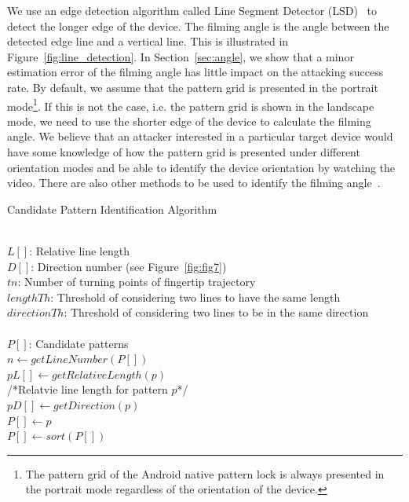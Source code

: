 We use an edge detection algorithm called Line Segment Detector (LSD)~\cite{grompone2010lsd} to detect the longer edge of the device.
The filming angle is the angle between the detected edge line and a vertical line. This is illustrated in Figure~\ref{fig:line_detection}.
In Section~\ref{sec:angle}, we show that a minor estimation error of the filming angle has little impact on the attacking success rate.
By default, we assume that the pattern grid is presented in the portrait
mode\footnote{The pattern grid of the Android native pattern lock is always presented in the portrait mode regardless of the orientation of the device.}. If this is
not the case, i.e. the pattern grid is shown in the landscape mode, we need
to use the shorter edge of the device to calculate the filming angle. We believe that an attacker interested in a particular target device would
have some knowledge of how the pattern grid is presented under different orientation modes and be able to identify the device orientation by watching the video.
There are also other methods to be used to identify the filming angle~\cite{Torralba:2002:DEI:628330.628820}.

\renewcommand{\algorithmicforall}{\textbf{for each}}
    \begin{algorithm}[!t]
        \caption{Candidate Pattern Identification Algorithm}
        \label{alg:alg1}
        \begin{algorithmic}[1]
            \REQUIRE~~\\
                $L[]$: Relative line length \\
                $D[]$: Direction number (see Figure~\ref{fig:fig7}) \\
                $tn$: Number of turning points of fingertip trajectory \\
                $lengthTh$: Threshold of considering two lines to have the same length\\
                $directionTh$: Threshold of considering two lines to be in the same direction\\
            \ENSURE~~\\
                $P[]$: Candidate patterns \\

                \STATE $n \leftarrow getLineNumber(P[])$ \\
                \STATE $pL[]  \leftarrow getRelativeLength(p)$ \\
                /*Relatvie line length for pattern $p$*/ \\
                \STATE $pD[] \leftarrow getDirection(p)$ \\
                        \STATE $P[] \leftarrow p$\\
                    \ENDIF
                \ENDIF
            \ENDFOR
            \STATE $P[] \leftarrow sort(P[])$
        \end{algorithmic}
    \end{algorithm}

